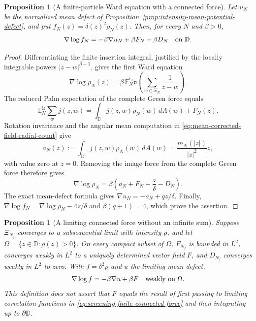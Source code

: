 \documentclass[11pt,a4paper]{article}
\numberwithin{equation}{section}
\newtheorem{proposition}[theorem]{Proposition}
\theoremstyle{definition}
\theoremstyle{remark}
\newcommand{\D}{\mathbb D}
\begin{document}
\begin{proposition}[A finite-particle Ward equation with a connected force]
\label{prop:screening-finite-connected-ward}
Let $u_N$ be the normalized mean defect of
Proposition~\ref{prop:intensity-mean-potential-defect}, and put
$f_N(z)=\delta(z)^2\rho_N(z)$. Then, for every $N$ and $\beta>0$,
\begin{equation}
 \nabla\log f_N=-\beta\nabla u_N+\beta F_N-\beta D_N
 \quad\hbox{on }\D.
 \label{eq:screening-finite-connected-ward}
\end{equation}
\end{proposition}

\begin{proof}
Differentiating the finite insertion integral, justified by the locally
integrable powers $|z-w|^{\beta-1}$, gives the first Ward equation
\[
 \nabla\log\rho_N(z)
 =\beta\,\mathbb E_N^{!z}
       \mathfrak v\left(\sum_{w\in\Xi_N}\frac1{z-w}\right).
\]
The reduced Palm expectation of the complete Green force equals
\[
 \mathbb E_N^{!z}\sum_wj(z,w)
 =\int_\D j(z,w)\rho_N(w)\,dA(w)+F_N(z).
\]
Rotation invariance and the angular mean computation in
\eqref{eq:mean-corrected-field-radial-count} give
\[
 a_N(z):=\int_\D j(z,w)\rho_N(w)\,dA(w)
 =\frac{m_N(|z|)}{|z|^2}z,
\]
with value zero at $z=0$. Removing the image force from the complete
Green force therefore gives
\[
 \nabla\log\rho_N
 =\beta\left(a_N+F_N+\frac z\delta-D_N\right).
\]
The exact mean-defect formula gives
$\nabla u_N=-a_N+qz/\delta$. Finally,
$\nabla\log f_N=\nabla\log\rho_N-4z/\delta$ and
$\beta(q+1)=4$, which prove the assertion.
\end{proof}

\begin{proposition}[A limiting connected force without an infinite sum]
\label{prop:screening-limiting-connected-force}
Suppose $\Xi_{N_j}$ converges to a subsequential limit with intensity
$\rho$, and let $\Omega=\{z\in\D:\rho(z)>0\}$. On every compact
subset of $\Omega$, $F_{N_j}$ is bounded in $L^2$, converges weakly
in $L^2$ to a uniquely determined vector field $F$, and $D_{N_j}$
converges weakly in $L^2$ to zero. With $f=\delta^2\rho$ and $u$
the limiting mean defect,
\begin{equation}
 \nabla\log f=-\beta\nabla u+\beta F
 \quad\hbox{weakly on }\Omega.
 \label{eq:screening-limiting-connected-ward}
\end{equation}
This definition does not assert that $F$ equals the result of first
passing to limiting correlation functions in
\eqref{eq:screening-finite-connected-force} and then integrating up
to $\partial\D$.
\end{proposition}
\end{document}
